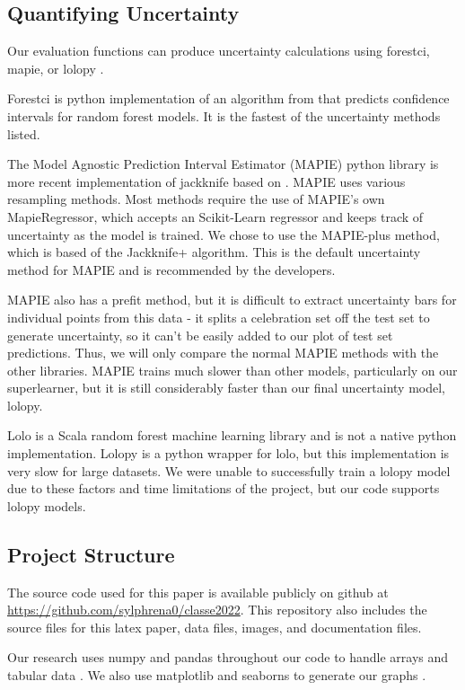 \documentclass[twocolumn, nofootinbib, secnumarabic, amssymb, nobibnotes, aps, prd]{revtex4-2}
\begin{document}
\subsection{Quantifying Uncertainty}\label{sec:uncertainty}
Our evaluation functions can produce uncertainty calculations using forestci, mapie, or lolopy \cite{Polimis2017, Taquet2022, Hutchinson2022}. 

Forestci is python implementation of an algorithm from \cite{Wager2014} that predicts confidence intervals for random forest models. It is the fastest of the uncertainty methods listed. 

The Model Agnostic Prediction Interval Estimator (MAPIE) python library is more recent implementation of jackknife based on \cite{Foygel2020}. MAPIE uses various resampling methods. Most methods require the use of MAPIE's own MapieRegressor, which accepts an Scikit-Learn regressor and keeps track of uncertainty as the model is trained. We chose to use the MAPIE-plus method, which is based of the Jackknife+ algorithm. This is the default uncertainty method for MAPIE and is recommended by the developers.

MAPIE also has a prefit method, but it is difficult to extract uncertainty bars for individual points from this data - it splits a celebration set off the test set to generate uncertainty, so it can't be easily added to our plot of test set predictions. Thus, we will only compare the normal MAPIE methods with the other libraries. MAPIE trains much slower than other models, particularly on our superlearner, but it is still considerably faster than our final uncertainty model, lolopy.

Lolo is a Scala random forest machine learning library and is not a native python implementation. Lolopy is a python wrapper for lolo, but this implementation is very slow for large datasets. We were unable to successfully train a lolopy model due to these factors and time limitations of the project, but our code supports lolopy models.

\subsection{Project Structure}
The source code used for this paper is available publicly on github at \url{https://github.com/sylphrena0/classe2022}. This repository also includes the source files for this latex paper, data files, images, and documentation files.

Our research uses numpy and pandas throughout our code to handle arrays and tabular data \cite{Harris2020array, Reback2020pandas}. We also use matplotlib and seaborns to generate our graphs \cite{Hunter2007, Waskom2021}.
\end{document}
